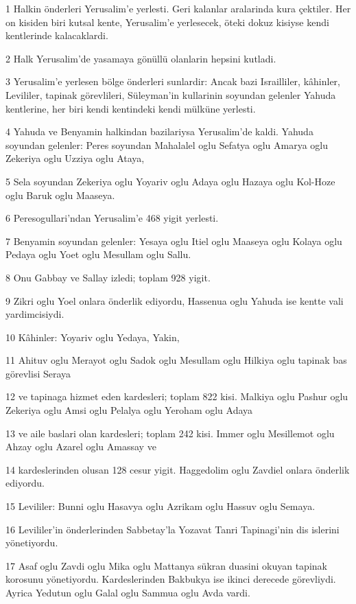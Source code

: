 \par 1 Halkin önderleri Yerusalim'e yerlesti. Geri kalanlar aralarinda kura çektiler. Her on kisiden biri kutsal kente, Yerusalim'e yerlesecek, öteki dokuz kisiyse kendi kentlerinde kalacaklardi.
\par 2 Halk Yerusalim'de yasamaya gönüllü olanlarin hepsini kutladi.
\par 3 Yerusalim'e yerlesen bölge önderleri sunlardir: Ancak bazi Israilliler, kâhinler, Levililer, tapinak görevlileri, Süleyman'in kullarinin soyundan gelenler Yahuda kentlerine, her biri kendi kentindeki kendi mülküne yerlesti.
\par 4 Yahuda ve Benyamin halkindan bazilariysa Yerusalim'de kaldi. Yahuda soyundan gelenler: Peres soyundan Mahalalel oglu Sefatya oglu Amarya oglu Zekeriya oglu Uzziya oglu Ataya,
\par 5 Sela soyundan Zekeriya oglu Yoyariv oglu Adaya oglu Hazaya oglu Kol-Hoze oglu Baruk oglu Maaseya.
\par 6 Peresogullari'ndan Yerusalim'e 468 yigit yerlesti.
\par 7 Benyamin soyundan gelenler: Yesaya oglu Itiel oglu Maaseya oglu Kolaya oglu Pedaya oglu Yoet oglu Mesullam oglu Sallu.
\par 8 Onu Gabbay ve Sallay izledi; toplam 928 yigit.
\par 9 Zikri oglu Yoel onlara önderlik ediyordu, Hassenua oglu Yahuda ise kentte vali yardimcisiydi.
\par 10 Kâhinler: Yoyariv oglu Yedaya, Yakin,
\par 11 Ahituv oglu Merayot oglu Sadok oglu Mesullam oglu Hilkiya oglu tapinak bas görevlisi Seraya
\par 12 ve tapinaga hizmet eden kardesleri; toplam 822 kisi. Malkiya oglu Pashur oglu Zekeriya oglu Amsi oglu Pelalya oglu Yeroham oglu Adaya
\par 13 ve aile baslari olan kardesleri; toplam 242 kisi. Immer oglu Mesillemot oglu Ahzay oglu Azarel oglu Amassay ve
\par 14 kardeslerinden olusan 128 cesur yigit. Haggedolim oglu Zavdiel onlara önderlik ediyordu.
\par 15 Levililer: Bunni oglu Hasavya oglu Azrikam oglu Hassuv oglu Semaya.
\par 16 Levililer'in önderlerinden Sabbetay'la Yozavat Tanri Tapinagi'nin dis islerini yönetiyordu.
\par 17 Asaf oglu Zavdi oglu Mika oglu Mattanya sükran duasini okuyan tapinak korosunu yönetiyordu. Kardeslerinden Bakbukya ise ikinci derecede görevliydi. Ayrica Yedutun oglu Galal oglu Sammua oglu Avda vardi.
